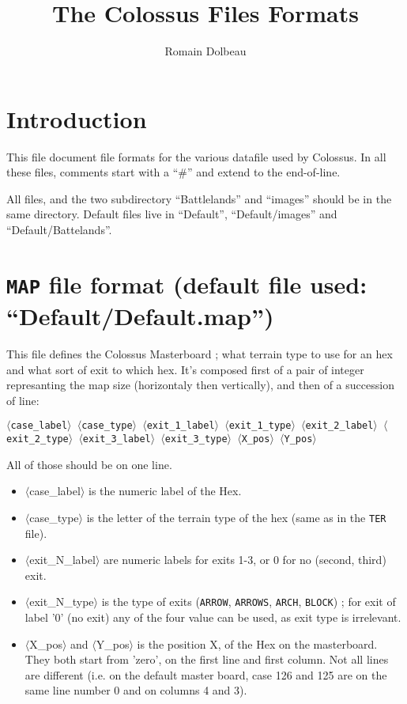 \documentclass{article}
\begin{document}

\title{The Colossus Files Formats}

\author{Romain Dolbeau}

\maketitle


\section* {Introduction}

This file document file formats for the various datafile used by Colossus. In all these files, comments start with a ``\#'' and extend to the end-of-line.

All files, and the two subdirectory ``Battlelands'' and ``images'' should be in the same directory. Default files live in ``Default'', ``Default/images'' and ``Default/Battelands''.

\section {\texttt{MAP} file format (default file used: ``Default/Default.map'')}

This file defines the Colossus Masterboard ; what terrain type to use for an hex and what sort of exit to which hex. It's composed first of a pair of integer represanting the map size (horizontaly then vertically), and then of a succession of line:

\texttt{$\langle$case\_label$\rangle$ $\langle$case\_type$\rangle$
 $\langle$exit\_1\_label$\rangle$ $\langle$exit\_1\_type$\rangle$
 $\langle$exit\_2\_label$\rangle$ $\langle$exit\_2\_type$\rangle$
 $\langle$exit\_3\_label$\rangle$ $\langle$exit\_3\_type$\rangle$
 $\langle$X\_pos$\rangle$ $\langle$Y\_pos$\rangle$}

All of those should be on one line.

\begin{itemize}
\item $\langle$case\_label$\rangle$ is the numeric label of the Hex.
\item $\langle$case\_type$\rangle$ is the letter of the terrain type of the hex (same as in the \texttt{TER} file).
\item $\langle$exit\_N\_label$\rangle$ are numeric labels for exits 1-3, or 0 for no (second, third) exit.
\item $\langle$exit\_N\_type$\rangle$ is the type of exits (\texttt{ARROW}, \texttt{ARROWS}, \texttt{ARCH}, \texttt{BLOCK}) ; for exit of label '0' (no exit) any of the four value can be used, as exit type is irrelevant.
\item $\langle$X\_pos$\rangle$ and $\langle$Y\_pos$\rangle$ is the position X, of the Hex on the masterboard. They both start from 'zero', on the first line and first column. Not all lines are different (i.e. on the default master board, case 126 and 125 are on the same line number 0 and on columns 4 and 3).
\end{itemize}
\end{document}
